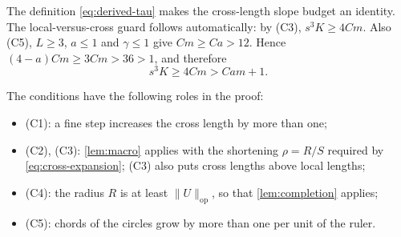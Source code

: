 \documentclass[11pt]{amsart}
\numberwithin{equation}{section}
\theoremstyle{definition}
\theoremstyle{remark}
\newcommand{\opnorm}[1]{\lVert #1\rVert_{\mathrm{op}}}
\newcommand{\cond}[1]{\textup{(C#1)}}
\begin{document}
The definition \eqref{eq:derived-tau} makes the cross-length slope
budget an identity. The local-versus-cross guard follows automatically:
by \cond3,
$s^3K\ge4Cm$. Also \cond5, $L\ge3$, $a\le1$ and $\gamma\le1$ give
$Cm\ge Ca>12$. Hence $(4-a)Cm\ge3Cm>36>1$, and therefore
\begin{equation}\label{eq:automatic-guard}
 s^3K\ge4Cm>Cam+1.
\end{equation}

The conditions have the following roles in the proof:
\begin{itemize}[leftmargin=2em,itemsep=1pt]
\item \cond1: a fine step increases the cross length by more than one;
\item \cond2, \cond3: \cref{lem:macro} applies with the shortening
 $\rho=R/S$ required by \eqref{eq:cross-expansion}; \cond3 also
 puts cross lengths above local lengths;
\item \cond4: the radius $R$ is at least $\opnorm U$, so that
 \cref{lem:completion} applies;
\item \cond5: chords of the circles grow by more than one per unit of
 the ruler.
\end{itemize}
\end{document}
